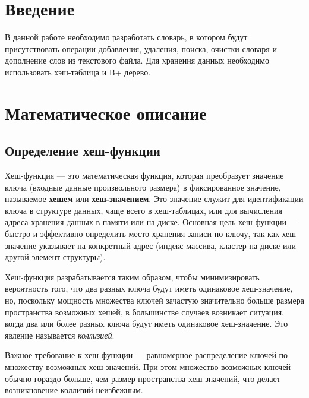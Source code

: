 \documentclass[10pt,a4paper,final]{article} %
\begin{document}
\tableofcontents

\newpage


\section* {Введение}
\par В данной работе необходимо разработать словарь, в котором будут присутствовать операции добавления, удаления, поиска, очистки словаря и  дополнение слов из текстового файла. Для хранения данных необходимо использовать хэш-таблица и B+ дерево. 



\newpage
\section{Математическое описание}
\subsection{Определение хеш-функции}

Хеш-функция — это математическая функция, которая преобразует значение ключа (входные данные произвольного размера) в фиксированное значение, называемое \textbf{хешем} или \textbf{хеш-значением}. Это значение служит для идентификации ключа в структуре данных, чаще всего в хеш-таблицах, или для вычисления адреса хранения данных в памяти или на диске. Основная цель хеш-функции — быстро и эффективно определить место хранения записи по ключу, так как хеш-значение указывает на конкретный адрес (индекс массива, кластер на диске или другой элемент структуры).

Хеш-функция разрабатывается таким образом, чтобы минимизировать вероятность того, что два разных ключа будут иметь одинаковое хеш-значение, но, поскольку мощность множества ключей зачастую значительно больше размера пространства возможных хешей, в большинстве случаев возникает ситуация, когда два или более разных ключа будут иметь одинаковое хеш-значение. Это явление называется \textit{коллизией}.

Важное требование к хеш-функции — равномерное распределение ключей по множеству возможных хеш-значений. При этом множество возможных ключей обычно гораздо больше, чем размер пространства хеш-значений, что делает возникновение коллизий неизбежным. 
\end{document}

